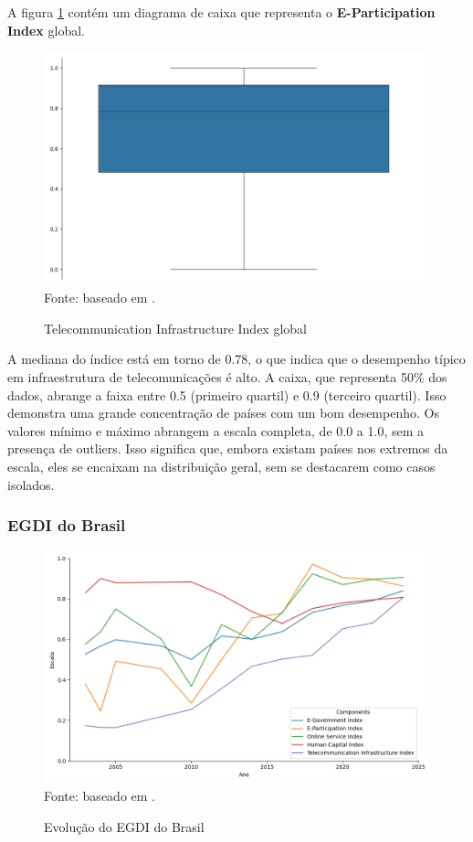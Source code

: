 A figura \ref{fig:boxplot_tci_global} contém um diagrama de caixa que representa o \textbf{E-Participation Index} global.

\begin{figure}[H]
	\centering
	\caption{Telecommunication Infrastructure Index global}
	\includegraphics[width=1\linewidth]{figuras/egdi/boxplot_tci_global.png}
	\label{fig:boxplot_tci_global}
	\footnotesize{Fonte: baseado em \cite{ONU_edgi_mapa}.}
\end{figure}

A mediana do índice está em torno de 0.78, o que indica que o desempenho típico em infraestrutura de telecomunicações é alto. A caixa, que representa 50\% dos dados, abrange a faixa entre 0.5 (primeiro quartil) e 0.9 (terceiro quartil). Isso demonstra uma grande concentração de países com um bom desempenho. Os valores mínimo e máximo abrangem a escala completa, de 0.0 a 1.0, sem a presença de outliers. Isso significa que, embora existam países nos extremos da escala, eles se encaixam na distribuição geral, sem se destacarem como casos isolados.


\subsubsection{EGDI do Brasil}

\begin{figure}[H]
	\centering
	\caption{Evolução do EGDI do Brasil}
	\includegraphics[width=1\linewidth]{figuras/egdi/lineplot_egdi_brasil.png}
	\label{fig:lineplot_egdi_brasil}
	\footnotesize{Fonte: baseado em \cite{ONU_edgi_mapa}.}
\end{figure}


